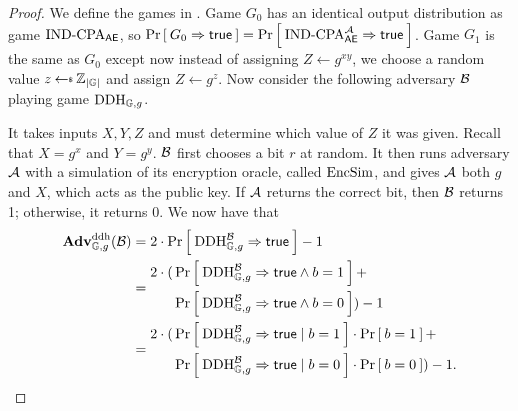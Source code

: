 \begin{proof}
	We define the games in . Game $G_0$ has an identical output distribution as game $\textnormal{IND-CPA}_{\textsf{AE}}$, so $\Pr\left[\: G_0\Rightarrow\mathsf{true} \:\right] = \Pr\left[\: \textnormal{IND-CPA}_{\textsf{AE}}^{\mathcal A}\Rightarrow\mathsf{true} \:\right]$. Game $G_1$ is the same as $G_0$ except now instead of assigning $Z \gets g^{xy}$, we choose a random value $z \getsr \Z_{|\group|}$ and assign $Z \gets g^z$. Now consider the following adversary ${\mathcal B}$ playing game $\textnormal{DDH}_{\mathbb{G}, g}$. 
	
	\begin{center}
	\end{center}
	
	It takes inputs $X,Y,Z$ and must determine which value of $Z$ it was given. Recall that $X = g^x$ and $Y = g^y$. ${\mathcal B}$ first chooses a bit $r$ at random. It then runs adversary ${\mathcal A}$ with a simulation of its encryption oracle, called $\textnormal{EncSim}$, and gives ${\mathcal A}$ both $g$ and $X$, which acts as the public key. If ${\mathcal A}$ returns the correct bit, then ${\mathcal B}$ returns 1; otherwise, it returns 0. We now have that
	\begin{align*}
		\mathbf{Adv}^{\mathrm{ddh}}_{\mathbb{G},g}({\mathcal B}) &= 2 \cdot \Pr\left[\: \textnormal{DDH}_{\mathbb{G}, g}^{\mathcal B}\Rightarrow\mathsf{true} \:\right] - 1 \\
		&=
		\begin{aligned}
			2 \cdot (&\Pr\left[\: \textnormal{DDH}_{\mathbb{G}, g}^{\mathcal B}\Rightarrow\mathsf{true} \wedge b=1 \:\right] + \\
			&\Pr\left[\: \textnormal{DDH}_{\mathbb{G}, g}^{\mathcal B}\Rightarrow\mathsf{true} \wedge b=0 \:\right]) - 1
		\end{aligned} \\
		&=
		\begin{aligned}
			2 \cdot (&\Pr\left[\: \textnormal{DDH}_{\mathbb{G}, g}^{\mathcal B}\Rightarrow\mathsf{true} \mid b=1 \:\right]\cdot\Pr\left[\: b=1 \:\right] + \\
			&\Pr\left[\: \textnormal{DDH}_{\mathbb{G}, g}^{\mathcal B}\Rightarrow\mathsf{true} \mid b=0 \:\right]\cdot\Pr\left[\: b=0 \:\right]) - 1 .
		\end{aligned}
	\end{align*} 
	

\end{proof}

